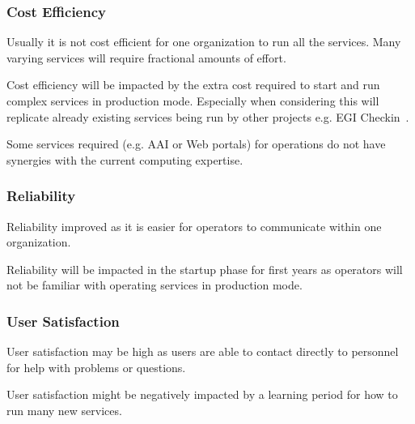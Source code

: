 \documentclass[12pt,a4paper]{article}
\begin{document}
\subsubsection*{Cost Efficiency}
\bitm
\item Usually it is not cost efficient for one organization to run all the services. Many varying services will require fractional amounts of effort.
\item Cost efficiency will be impacted by the extra cost required to start and run complex services in production mode. 
Especially when considering this will replicate already existing services being run by other \einfra projects e.g. EGI Checkin~\cite{egi-checkin}.
\item Some services required (e.g. AAI or Web portals) for \ED operations do not have synergies with the current \EC computing expertise.
\eitm

\subsubsection*{Reliability}
\bitm
\item Reliability improved as it is easier for operators to communicate within one organization. %
\item Reliability will be impacted in the startup phase for first years as operators will not be familiar with operating services in production mode.
\eitm

\subsubsection*{User Satisfaction}
\bitm
\item User satisfaction may be high as users are able to contact directly to \EC personnel for help with problems or questions.
\item User satisfaction might be negatively impacted by a learning period for how to run many new services.
\eitm

\end{document}
